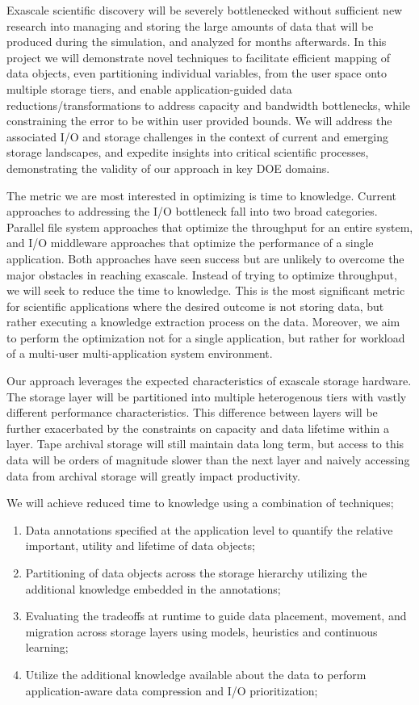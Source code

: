 Exascale scientific discovery will be severely bottlenecked without
sufficient new research into managing and storing the large amounts of data
that will be produced during the simulation, and analyzed for months
afterwards.  
%
In this project we will demonstrate novel techniques to
facilitate efficient mapping of data objects, even partitioning individual
variables, from the user space onto multiple storage tiers, and enable
application-guided data reductions/transformations to address capacity and
bandwidth bottlenecks, while constraining the error to be within user
provided bounds.
%
We will address the associated I/O and storage challenges in the context of
current and emerging storage landscapes, and expedite insights into critical
scientific processes, demonstrating the validity of our approach in key DOE
domains. 

The metric we are most interested in optimizing is time to knowledge. Current
approaches to addressing the I/O bottleneck fall into two broad
categories. Parallel file system approaches that optimize the throughput for
an entire system, and I/O middleware approaches that optimize the
performance of a single application. Both approaches have seen success but
are unlikely to overcome the major obstacles in reaching exascale. Instead
of trying to optimize throughput, we will seek to reduce the time to
knowledge. This is the most significant metric for scientific applications
where the desired outcome is not storing data, but rather executing a
knowledge extraction process on the data. Moreover, we aim to perform the
optimization not for a single application, but rather for workload of a
multi-user multi-application system environment.

Our approach leverages the expected characteristics of exascale storage
hardware. The storage layer will be partitioned into multiple heterogenous
tiers with vastly different performance characteristics. This difference
between layers will be further exacerbated by the constraints on capacity
and data lifetime within a layer. Tape archival storage will still maintain
data long term, but access to this data will be orders of magnitude slower
than the next layer and naively accessing data from archival storage will
greatly impact productivity. 

We will achieve reduced time to knowledge using a combination of techniques;
\begin{enumerate}
\item Data annotations specified at the application level to quantify the
  relative important, utility and lifetime of data objects;
\item Partitioning of data objects across the storage hierarchy utilizing
  the additional knowledge embedded in the annotations;
\item Evaluating the tradeoffs at runtime to guide data placement, movement,
  and migration across storage layers using models, heuristics and continuous
  learning;
\item Utilize the additional knowledge available about the data to perform
  application-aware data compression and I/O prioritization;
\end{enumerate}


